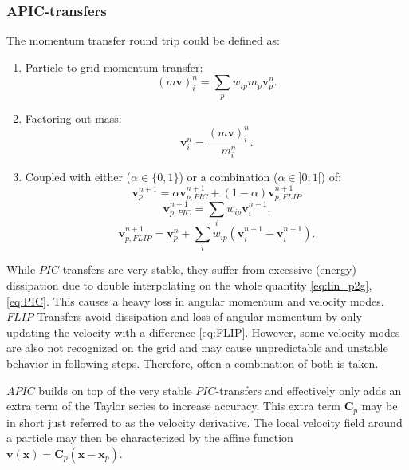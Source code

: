 \documentclass[m,times]{cgMA}
\begin{document}
\subsubsection{APIC-transfers}\label{sec:apic}
The momentum transfer round trip could be defined as:
\begin{enumerate}
  \item Particle to grid momentum transfer:
    \begin{equation}\label{eq:lin_p2g}
      (m\boldsymbol{v})_i^n = \sum_p w_{ip}m_p\boldsymbol{v}^n_p.
    \end{equation}
  \item Factoring out mass:
    \begin{equation}
      \boldsymbol{v}_i^n = \frac{(m\boldsymbol{v})_i^n}{m_i^n}.
    \end{equation}
  \item Coupled with either ($\alpha \in \{0,1\}$) or a combination ($\alpha \in ]0;1[$) of:
    \begin{equation}
      \boldsymbol{v}_p^{n+1} = \alpha\boldsymbol{v}_{p,{PIC}}^{n+1} + (1-\alpha)\boldsymbol{v}_{p,{FLIP}}^{n+1}
    \end{equation}
    \begin{equation}\label{eq:PIC}
      \boldsymbol{v}_{p,{PIC}}^{n+1} = \sum_i w_{ip}\boldsymbol{v}_i^{n+1}.
    \end{equation}
    \begin{equation}\label{eq:FLIP}
      \boldsymbol{v}_{p,{FLIP}}^{n+1} = \boldsymbol{v}_p^{n} + \sum_i w_{ip}(\boldsymbol{v}_i^{n+1}-\boldsymbol{v}_i^{n+1}).
    \end{equation}
\end{enumerate}
While $PIC$-transfers are very stable, they suffer from excessive (energy) dissipation due to double interpolating on the whole quantity \ref{eq:lin_p2g},\ref{eq:PIC}. This causes a heavy loss in angular momentum and velocity modes.
$FLIP$-Transfers avoid dissipation and loss of angular momentum by only updating the velocity with a difference \ref{eq:FLIP}. However, some velocity modes are also not recognized on the grid and may cause unpredictable and unstable behavior in following steps. Therefore, often a combination of both is taken.

$APIC$ builds on top of the very stable $PIC$-transfers and effectively only adds an extra term of the Taylor series to increase accuracy. This extra term $\boldsymbol{C}_p$ may be in short just referred to as the velocity derivative. The local velocity field around a particle may then be characterized by the affine function $\boldsymbol{v}(\boldsymbol{x}) = \boldsymbol{C}_p(\boldsymbol{x}-\boldsymbol{x}_p)$.
\end{document}
